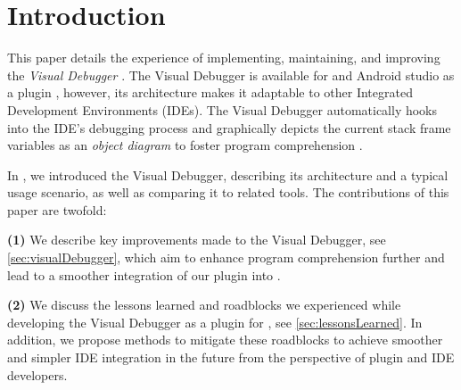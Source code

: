 \documentclass[sigconf]{acmart}
\begin{document}



\maketitle

\renewcommand\UrlFont{\color{blue}}

\section{Introduction}
This paper details the experience of implementing, maintaining, and improving the \textit{Visual Debugger} \cite{krauterVisualDebuggerTool2022}.
The Visual Debugger is available for \intellij{} and Android studio as a plugin \cite{timkrauterVisualDebuggerIntelliJ2023}, however, its architecture makes it adaptable to other Integrated Development Environments (IDEs).
The Visual Debugger automatically hooks into the IDE's debugging process and graphically depicts the current stack frame variables as an \textit{object diagram} to foster program comprehension \cite{krauterVisualDebuggerTool2022}.

In \cite{krauterVisualDebuggerTool2022}, we introduced the Visual Debugger, describing its architecture and a typical usage scenario, as well as comparing it to related tools.
The contributions of this paper are twofold:

\textbf{(1)} We describe key improvements made to the Visual Debugger, see \autoref{sec:visualDebugger}, which aim to enhance program comprehension further and lead to a smoother integration of our plugin into \intellij{}.

\textbf{(2)} We discuss the lessons learned and roadblocks we experienced while developing the Visual Debugger as a plugin for \intellij{}, see \autoref{sec:lessonsLearned}.
In addition, we propose methods to mitigate these roadblocks to achieve smoother and simpler IDE integration in the future from the perspective of plugin and IDE developers. 
\end{document}
